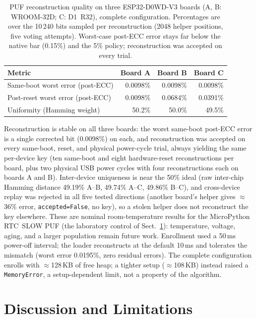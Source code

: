 \documentclass[runningheads]{llncs}
\begin{document}
\begin{table}[ht]
\caption{PUF reconstruction quality on three ESP32-D0WD-V3 boards (A, B: WROOM-32D; C: D1~R32), complete configuration. Percentages are over the 10\,240 bits sampled per reconstruction (2048 helper positions, five voting attempts). Worst-case post-ECC error stays far below the native bar (0.15\%) and the 5\% policy; reconstruction was accepted on every trial.}
\label{tab:puf_quality}
\centering
\begin{tabular}{lrrr}
\toprule
Metric & Board A & Board B & Board C \\
\midrule
Same-boot worst error (post-ECC) & 0.0098\% & 0.0098\% & 0.0098\% \\
Post-reset worst error (post-ECC) & 0.0098\% & 0.0684\% & 0.0391\% \\
Uniformity (Hamming weight) & 50.2\% & 50.0\% & 49.5\% \\
\bottomrule
\end{tabular}
\end{table}

\noindent Reconstruction is stable on all three boards: the worst same-boot post-ECC error is a single corrected bit (0.0098\%) on each, and reconstruction was accepted on every same-boot, reset, and physical power-cycle trial, always yielding the same per-device key (ten same-boot and eight hardware-reset reconstructions per board, plus two physical USB power cycles with four reconstructions each on boards A and B). Inter-device uniqueness is near the 50\% ideal (raw inter-chip Hamming distance 49.19\% A--B, 49.74\% A--C, 49.86\% B--C), and cross-device replay was rejected in all five tested directions (another board's helper gives ${\approx}$36\% error, \texttt{accepted=False}, no key), so a stolen helper does not reconstruct the key elsewhere. These are nominal room-temperature results for the MicroPython RTC~SLOW PUF (the laboratory control of Sect.~\ref{sec:discussion}): temperature, voltage, aging, and a larger population remain future work. Enrollment used a 50\,ms power-off interval; the loader reconstructs at the default 10\,ms and tolerates the mismatch (worst error 0.0195\%, zero residual errors). The complete configuration enrolls with ${\approx}$128\,KB of free heap; a tighter setup (${\approx}$108\,KB) instead raised a \texttt{MemoryError}, a setup-dependent limit, not a property of the algorithm.


\section{Discussion and Limitations}
\label{sec:discussion}
\end{document}
